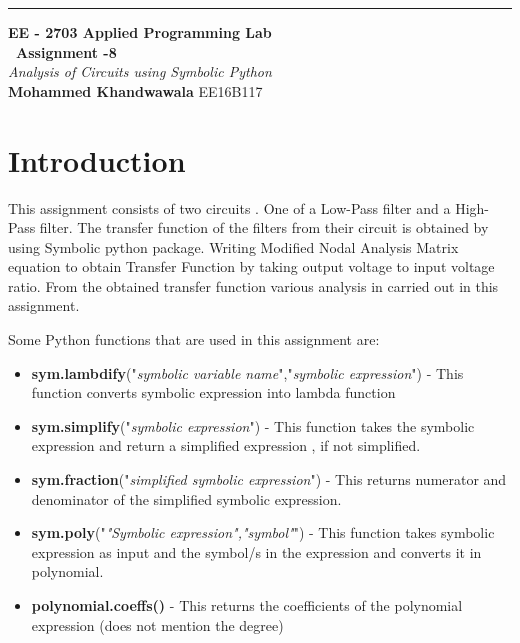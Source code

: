 \documentclass[a4paper]{article}
\begin{document}
\begin{titlepage}
	\raggedleft
	\rule{1pt}{\textheight} 
	\hspace{0.05\textwidth} 
	\parbox[b]{0.75\textwidth}{		
		{\LARGE\bfseries EE - 2703 Applied Programming Lab \\[0.5\baselineskip]  ~\huge Assignment -8}\\[2\baselineskip] 
		{\large\textit{Analysis of Circuits using Symbolic Python}}\\[4\baselineskip] 
		{\Large\textbf{Mohammed Khandwawala}}
        \large EE16B117
		\vspace{0.5\textheight}  
	}

\end{titlepage}


\tableofcontents


\section{Introduction}
This assignment consists of two circuits . One of a Low-Pass filter and a High-Pass filter. The transfer function of the filters from their circuit is obtained by using Symbolic python package. Writing Modified Nodal Analysis Matrix equation to obtain Transfer Function by taking output voltage to input voltage ratio. From the obtained transfer function various analysis in carried out in this assignment.

Some Python functions that are used in this assignment are:
\begin{itemize}
\item \textbf{sym.lambdify}("\textit{symbolic variable name}","\textit{symbolic expression}") - This function converts symbolic expression into lambda function
\item \textbf{sym.simplify}("\textit{symbolic expression}") - This function takes the symbolic expression and return a simplified expression , if not simplified.
\item \textbf{sym.fraction}("\textit{simplified symbolic expression}") - This returns numerator and denominator of the simplified symbolic expression.
\item \textbf{sym.poly}("\textit{"Symbolic expression","symbol"}") - This function takes symbolic expression as input and the symbol/s in the expression and converts it in polynomial.
\item \textbf{polynomial.coeffs()} - This returns the coefficients of the polynomial expression (does not mention the degree)
\end{itemize}
\end{document}
